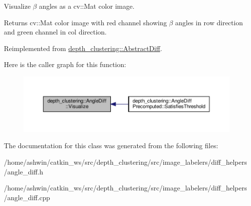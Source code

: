 Visualize $\beta$ angles as a {\ttfamily cv\+::\+Mat} color image. 

\begin{DoxyReturn}{Returns}
{\ttfamily cv\+::\+Mat} color image with red channel showing $\beta$ angles in row direction and green channel in col direction. 
\end{DoxyReturn}


Reimplemented from \hyperlink{classdepth__clustering_1_1AbstractDiff_a45314bf711f35e53590af28bdfc45313}{depth\+\_\+clustering\+::\+Abstract\+Diff}.

Here is the caller graph for this function\+:\nopagebreak
\begin{figure}[H]
\begin{center}
\leavevmode
\includegraphics[width=350pt]{classdepth__clustering_1_1AngleDiff_a462e4aadd35ca06e9b061d08c9787074_icgraph}
\end{center}
\end{figure}


The documentation for this class was generated from the following files\+:\begin{DoxyCompactItemize}
\item 
/home/ashwin/catkin\+\_\+ws/src/depth\+\_\+clustering/src/image\+\_\+labelers/diff\+\_\+helpers/angle\+\_\+diff.\+h\item 
/home/ashwin/catkin\+\_\+ws/src/depth\+\_\+clustering/src/image\+\_\+labelers/diff\+\_\+helpers/angle\+\_\+diff.\+cpp\end{DoxyCompactItemize}
